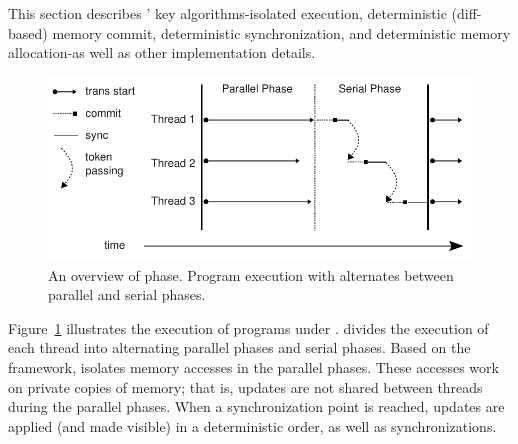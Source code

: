 \label{sec:dthreads-architecture}
This section describes \dthreads{}’ key {algorithms}-{isolated} execution, deterministic (diff-based) memory commit, deterministic synchronization, and deterministic memory {allocation}-{as} well as other implementation details.

\begin{figure}
{\centering 
\includegraphics[width=6in]{dthreads/figure/phase}
\caption{An overview of \dthreads{} phase. Program execution with \dthreads{} alternates between parallel and serial phases.\label{fig:phase}}
}
\end{figure}

Figure~\ref{fig:phase} illustrates the execution of programs under \dthreads{}. \dthreads{} divides the execution of each thread into alternating parallel phases and serial phases. 
Based on the \sheriff{} framework, \dthreads{} isolates memory accesses in the parallel phases. These accesses work on private copies of memory; that is, updates are not shared between threads during the parallel phases. When a synchronization point is reached, updates are applied (and made visible) in a deterministic order, as well as synchronizations. 
  
